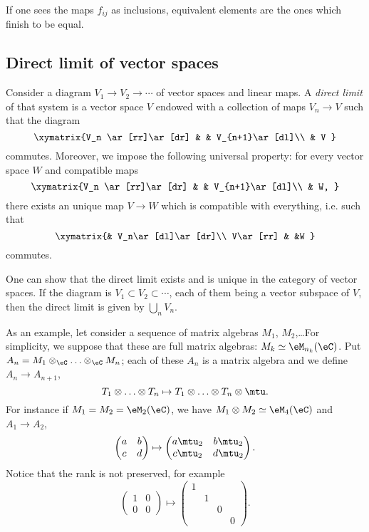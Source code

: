 If one sees the maps $f_{ij}$ as inclusions, equivalent elements are the ones which finish to be equal.

\subsection{Direct limit of vector spaces}

Consider a diagram $V_1\to V_2\to\cdots$ of vector spaces and linear maps. A \emph{direct limit} of that system is a vector space $V$ endowed with a collection of maps $V_n\to V$ such that the diagram
\[
	\xymatrix{%
		V_n \ar[rr]\ar[dr]		&		&	V_{n+1}\ar[dl]\\
		& V
	}
\]
commutes. Moreover, we impose the following universal property: for every vector space $W$ and compatible maps
\[
	\xymatrix{%
		V_n \ar[rr]\ar[dr]		&		&	V_{n+1}\ar[dl]\\
		& W,
	}
\]
there exists an unique map $V\to W$ which is compatible with everything, i.e. such that
\[
	\xymatrix{%
		& V_n\ar[dl]\ar[dr]\\
		V\ar[rr]		&			&W
	}
\]
commutes.

One can show that the direct limit exists and is unique in the category of vector spaces. If the diagram is $V_1\subset V_2\subset \cdots$, each of them being a vector subspace of $V$, then the direct limit is given by $\bigcup_nV_n$.

As an example\label{PgExDirectLimVS}, let consider a sequence of matrix algebras $M_1$, $M_2$,\ldots For simplicity, we suppose that these are full matrix algebras: $M_k\simeq \eM_{n_k}(\eC)$. Put $A_n=M_1\otimes_{\eC}\ldots\otimes_{\eC} M_n$; each of these $A_n$ is a matrix algebra and we define $A_n\to A_{n+1}$,
\[
	T_1\otimes\ldots\otimes T_n\mapsto T_1\otimes\ldots\otimes T_n\otimes\mtu.
\]
For instance if $M_1=M_2=\eM_2(\eC)$, we have $M_1\otimes M_2\simeq\eM_4(\eC)$ and $A_1\to A_2$,
\[
	\begin{pmatrix}
		a & b \\
		c & d
	\end{pmatrix}
	\mapsto
	\begin{pmatrix}
		a\mtu_2 & b\mtu_2 \\
		c\mtu_2 & d\mtu_2
	\end{pmatrix}.
\]
Notice that the rank is not preserved, for example
\[
	\begin{pmatrix}
		1 & 0 \\
		0 & 0
	\end{pmatrix}
	\mapsto
	\begin{pmatrix}
		1            \\
		 & 1         \\
		 &   & 0     \\
		 &   &   & 0
	\end{pmatrix}.
\]

